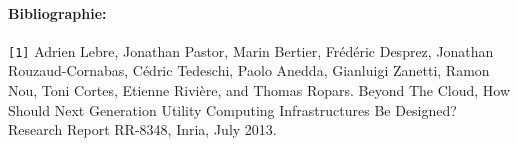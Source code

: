 \documentclass[a4paper,11pt]{article}
\begin{document}
\begin{note}
\paragraph*{Bibliographie:\\}
%
\texttt{[1]} Adrien Lebre, Jonathan Pastor, Marin Bertier, Frédéric Desprez, Jonathan Rouzaud-Cornabas, Cédric Tedeschi, Paolo Anedda, Gianluigi Zanetti, Ramon Nou, Toni Cortes, Etienne Rivière, and Thomas Ropars. Beyond The Cloud, How Should Next Generation Utility Computing Infrastructures Be Designed? Research Report RR-8348, Inria, July 2013.\\

\end{note}
\end{document}
